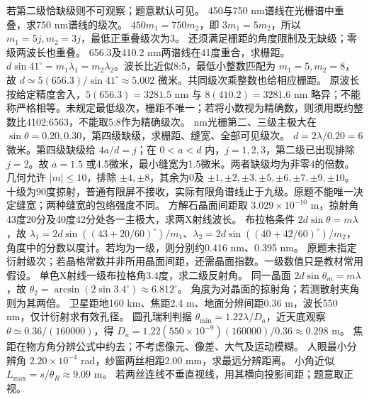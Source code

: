 \crosscheck 若第二级恰缺级则不可观察；题意默认可见。
\problemtext 450与750 nm谱线在光栅谱中重叠，求750 nm谱线的级次。
\workings $450m_1=750m_2$，即 $3m_1=5m_2$，所以 $m_1=5j,m_2=3j$，最低正重叠级次为3。
\crosscheck 还须满足栅距的角度限制及无缺级；零级两波长也重叠。
\problemtext 656.3及410.2 nm两谱线在41度重合，求栅距。
\workings $d\sin41^\circ=m_1\lambda_1=m_2\lambda_2$。波长比近似8:5，最低小整数匹配为 $m_1=5,m_2=8$，故 $d\simeq5(656.3)/\sin41^\circ\approx5.002$ 微米。共同级次乘整数也给相应栅距。
\crosscheck 原波长按给定精度舍入，$5(656.3)=3281.5$ nm 与 $8(410.2)=3281.6$ nm 略异；不能称严格相等。未规定最低级次，栅距不唯一；若将小数视为精确数，则须用既约整数比4102:6563，不能取5:8作为精确级次。
 nm光栅第二、三级主极大在 $\sin\theta=0.20,0.30$，第四级缺级，求栅距、缝宽、全部可见级次。
\workings $d=2\lambda/0.20=6$ 微米。第四级缺级给 $4a/d=j$；在 $0<a<d$ 内，$j=1,2,3$，第二级已出现排除 $j=2$。故 $a=1.5$ 或4.5微米，最小缝宽为1.5微米。两者缺级均为非零4的倍数。几何允许 $|m|\le10$，排除 $\pm4,\pm8$，其余为0及 $\pm1,\pm2,\pm3,\pm5,\pm6,\pm7,\pm9,\pm10$。
\crosscheck 十级为90度掠射，普通有限屏不接收，实际有限角谱线止于九级。原题不能唯一决定缝宽；两种缝宽的包络强度不同。
\problemtext 方解石晶面间距取 $3.029\times10^{-10}$ m，掠射角43度20分及40度42分处各一主极大，求两X射线波长。
\workings 布拉格条件 $2d\sin\theta=m\lambda$，故 $\lambda_1=2d\sin((43+20/60)^\circ)/m_1$、$\lambda_2=2d\sin((40+42/60)^\circ)/m_2$，角度中的分数以度计。若均为一级，则分别约0.416 nm、0.395 nm。
\crosscheck 原题未指定衍射级次；若晶格常数并非所用晶面间距，还需晶面指数。一级数值只是教材常用假设。
\problemtext 单色X射线一级布拉格角3.4度，求二级反射角。
\workings 同一晶面 $2d\sin\theta_m=m\lambda$，故 $\theta_2=\arcsin(2\sin3.4^\circ)\approx6.812^\circ$。
\crosscheck 角度为对晶面的掠射角；若测散射夹角则为其两倍。
\problemtext 卫星距地160 km、焦距2.4 m、地面分辨间距0.36 m，波长550 nm，仅计衍射求有效孔径。
\workings 圆孔瑞利判据 $\theta_{\min}=1.22\lambda/D_a$，近天底观察 $\theta\simeq0.36/(160000)$，得 $D_a=1.22(550\times10^{-9})(160000)/0.36\approx0.298$ m。
\crosscheck 焦距在物方角分辨公式中约去；不考虑像元、像差、大气及运动模糊。
\problemtext 人眼最小分辨角 $2.20\times10^{-4}$ rad，纱窗两丝相距2.00 mm，求最远分辨距离。
\workings 小角近似 $L_{\max}=s/\theta_R\approx9.09$ m。
\crosscheck 若两丝连线不垂直视线，用其横向投影间距；题意取正视。

